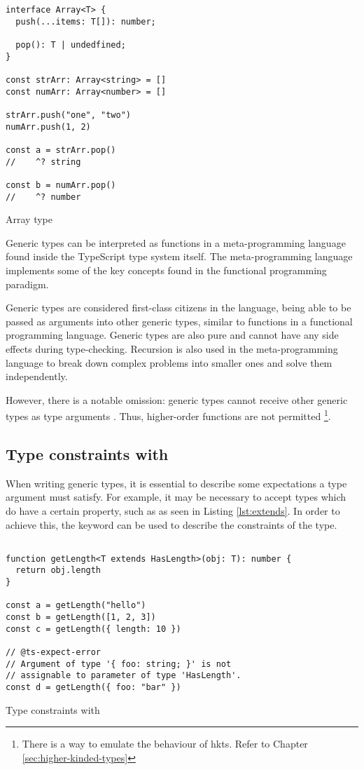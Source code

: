 \begin{listing}[ht]
  \begin{verbatim}
interface Array<T> {
  push(...items: T[]): number;

  pop(): T | undedfined;
}

const strArr: Array<string> = []
const numArr: Array<number> = []

strArr.push("one", "two")
numArr.push(1, 2)

const a = strArr.pop()
//    ^? string

const b = numArr.pop()
//    ^? number
\end{verbatim}
  \caption{Array type}\label{lst:array-type}
\end{listing}

Generic types can be interpreted as functions in a meta-programming language found inside the TypeScript type system itself. The meta-programming language implements some of the key concepts found in the functional programming paradigm.

Generic types are considered first-class citizens in the language, being able to be passed as arguments into other generic types, similar to functions in a functional programming language. Generic types are also pure and cannot have any side effects during type-checking. Recursion is also used in the meta-programming language to break down complex problems into smaller ones and solve them independently.

However, there is a notable omission: generic types cannot receive other generic types as type arguments \cite{TypeInferenceHigherorder}. Thus, higher-order functions are not permitted \footnote{There is a way to emulate the behaviour of \acrshort{hkt}s. Refer to Chapter \ref{sec:higher-kinded-types}}.

\subsection{Type constraints with }

When writing generic types, it is essential to describe some expectations a type argument must satisfy. For example, it may be necessary to accept types which do have a certain property, such as  as seen in Listing \ref{lst:extends}. In order to achieve this, the  keyword can be used to describe the constraints of the type.

\begin{listing}[ht]
  \begin{verbatim}

function getLength<T extends HasLength>(obj: T): number {
  return obj.length
}

const a = getLength("hello")
const b = getLength([1, 2, 3])
const c = getLength({ length: 10 })

// @ts-expect-error 
// Argument of type '{ foo: string; }' is not 
// assignable to parameter of type 'HasLength'.
const d = getLength({ foo: "bar" })
\end{verbatim}
  \caption{Type constraints with }\label{lst:extends}
\end{listing}


